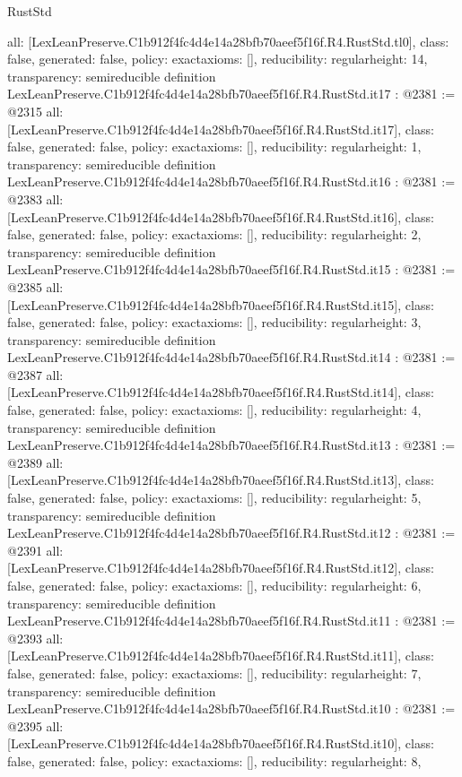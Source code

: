 \begin{lexlean}{RustStd}
\begin{coremodule}
{  all: [LexLeanPreserve.C1b912f4fc4d4e14a28bfb70aeef5f16f.R4.RustStd.tl0],
  class: false,
  generated: false,
  policy: exact{axioms: []},
  reducibility: regular{height: 14},
  transparency: semireducible
}
definition LexLeanPreserve.C1b912f4fc4d4e14a28bfb70aeef5f16f.R4.RustStd.it17 : @2381 := @2315 {
  all: [LexLeanPreserve.C1b912f4fc4d4e14a28bfb70aeef5f16f.R4.RustStd.it17],
  class: false,
  generated: false,
  policy: exact{axioms: []},
  reducibility: regular{height: 1},
  transparency: semireducible
}
definition LexLeanPreserve.C1b912f4fc4d4e14a28bfb70aeef5f16f.R4.RustStd.it16 : @2381 := @2383 {
  all: [LexLeanPreserve.C1b912f4fc4d4e14a28bfb70aeef5f16f.R4.RustStd.it16],
  class: false,
  generated: false,
  policy: exact{axioms: []},
  reducibility: regular{height: 2},
  transparency: semireducible
}
definition LexLeanPreserve.C1b912f4fc4d4e14a28bfb70aeef5f16f.R4.RustStd.it15 : @2381 := @2385 {
  all: [LexLeanPreserve.C1b912f4fc4d4e14a28bfb70aeef5f16f.R4.RustStd.it15],
  class: false,
  generated: false,
  policy: exact{axioms: []},
  reducibility: regular{height: 3},
  transparency: semireducible
}
definition LexLeanPreserve.C1b912f4fc4d4e14a28bfb70aeef5f16f.R4.RustStd.it14 : @2381 := @2387 {
  all: [LexLeanPreserve.C1b912f4fc4d4e14a28bfb70aeef5f16f.R4.RustStd.it14],
  class: false,
  generated: false,
  policy: exact{axioms: []},
  reducibility: regular{height: 4},
  transparency: semireducible
}
definition LexLeanPreserve.C1b912f4fc4d4e14a28bfb70aeef5f16f.R4.RustStd.it13 : @2381 := @2389 {
  all: [LexLeanPreserve.C1b912f4fc4d4e14a28bfb70aeef5f16f.R4.RustStd.it13],
  class: false,
  generated: false,
  policy: exact{axioms: []},
  reducibility: regular{height: 5},
  transparency: semireducible
}
definition LexLeanPreserve.C1b912f4fc4d4e14a28bfb70aeef5f16f.R4.RustStd.it12 : @2381 := @2391 {
  all: [LexLeanPreserve.C1b912f4fc4d4e14a28bfb70aeef5f16f.R4.RustStd.it12],
  class: false,
  generated: false,
  policy: exact{axioms: []},
  reducibility: regular{height: 6},
  transparency: semireducible
}
definition LexLeanPreserve.C1b912f4fc4d4e14a28bfb70aeef5f16f.R4.RustStd.it11 : @2381 := @2393 {
  all: [LexLeanPreserve.C1b912f4fc4d4e14a28bfb70aeef5f16f.R4.RustStd.it11],
  class: false,
  generated: false,
  policy: exact{axioms: []},
  reducibility: regular{height: 7},
  transparency: semireducible
}
definition LexLeanPreserve.C1b912f4fc4d4e14a28bfb70aeef5f16f.R4.RustStd.it10 : @2381 := @2395 {
  all: [LexLeanPreserve.C1b912f4fc4d4e14a28bfb70aeef5f16f.R4.RustStd.it10],
  class: false,
  generated: false,
  policy: exact{axioms: []},
  reducibility: regular{height: 8},
}
\end{coremodule}
\end{lexlean}
